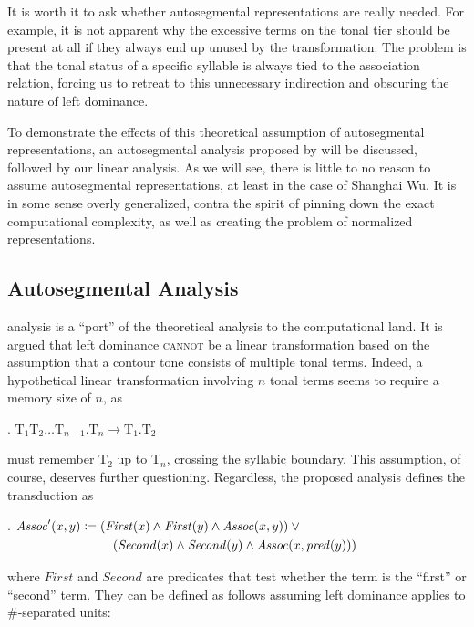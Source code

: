 \documentclass[12pt, a4paper]{report}
\newcommand{\shift}{\hspace*{1em}}
\newcommand{\textemph}[1]{\textsc{#1}}
\begin{document}
It is worth it to ask whether autosegmental representations are really
needed.  For example, it is not apparent why the excessive terms on
the tonal tier should be present at all if they always end up unused
by the transformation.  The problem is that the tonal status of a
specific syllable is always tied to the association relation, forcing
us to retreat to this unnecessary indirection and obscuring the nature
of left dominance.

To demonstrate the effects of this theoretical assumption of
autosegmental representations, an autosegmental analysis proposed by
\textcite{z20eaislfmdft} will be discussed, followed by our linear
analysis.  As we will see, there is little to no reason to assume
autosegmental representations, at least in the case of Shanghai Wu.
It is in some sense overly generalized, contra the spirit of pinning
down the exact computational complexity, as well as creating the
problem of normalized representations.

\subsection{Autosegmental Analysis}
 analysis is a \enquote{port} of the
theoretical analysis to the computational land.  It is argued that
left dominance \textemph{cannot} be a linear transformation based on
the assumption that a contour tone consists of multiple tonal terms.
Indeed, a hypothetical linear transformation involving \(n\) tonal
terms seems to require a memory size of \(n\), as

\ex. \(\text{T}_{1}\text{T}_{2}\ldots\text{T}_{n-1}.\text{T}_{n} \to
\text{T}_{1}.\text{T}_{2}\)

must remember \(\text{T}_{2}\) up to \(\text{T}_{n}\), crossing the
syllabic boundary.  This assumption, of course, deserves further
questioning.  Regardless, the proposed analysis defines the
transduction as

\ex.
\(\mathit{Assoc}'(x, y) \coloneq
\begin{aligned}[t]
  & (\mathit{First}(x) \land \mathit{First}(y) \land
    \mathit{Assoc}(x, y)) \lor \mbox{}\\
  &\shift (\mathit{Second}(x) \land \mathit{Second}(y) \land
    \mathit{Assoc}(x, \mathit{pred}(y)))
\end{aligned}\)

where \(\mathit{First}\) and \(\mathit{Second}\) are predicates that
test whether the term is the \enquote{first} or \enquote{second} term.
They can be defined as follows assuming left dominance applies to
\(\#\)-separated units:
\end{document}
